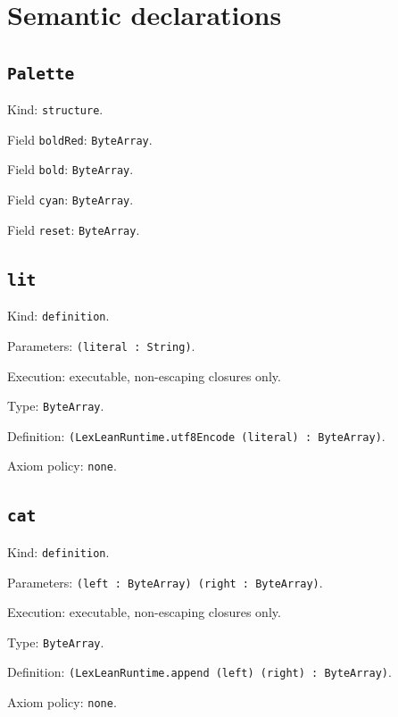 \documentclass[11pt]{article}
\begin{document}
\section*{Semantic declarations}
\subsection*{\texttt{Palette}}
\noindent Kind: \texttt{structure}.\par
\noindent Field \texttt{boldRed}: \texttt{ByteArray}.\par
\noindent Field \texttt{bold}: \texttt{ByteArray}.\par
\noindent Field \texttt{cyan}: \texttt{ByteArray}.\par
\noindent Field \texttt{reset}: \texttt{ByteArray}.\par
\subsection*{\texttt{lit}}
\noindent Kind: \texttt{definition}.\par
\noindent Parameters: \texttt{(literal : String)}.\par
\noindent Execution: executable, non-escaping closures only.\par
\noindent Type: \texttt{ByteArray}.\par
\noindent Definition: \texttt{(LexLeanRuntime.utf8Encode (literal) : ByteArray)}.\par
\noindent Axiom policy: \texttt{none}.\par
\subsection*{\texttt{cat}}
\noindent Kind: \texttt{definition}.\par
\noindent Parameters: \texttt{(left : ByteArray) (right : ByteArray)}.\par
\noindent Execution: executable, non-escaping closures only.\par
\noindent Type: \texttt{ByteArray}.\par
\noindent Definition: \texttt{(LexLeanRuntime.append (left) (right) : ByteArray)}.\par
\noindent Axiom policy: \texttt{none}.\par
\end{document}
